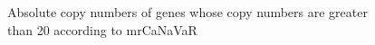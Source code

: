\begin{figure}
    \centering
    \quad
    \caption{Absolute copy numbers of genes whose copy numbers are greater than 20 according to mrCaNaVaR}
    \label{greaterThan20}
\end{figure}